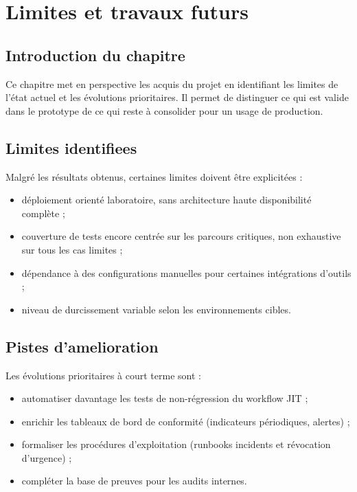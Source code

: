 \chapter{Limites et travaux futurs}

\section{Introduction du chapitre}
Ce chapitre met en perspective les acquis du projet en identifiant les limites de l'état actuel et les évolutions prioritaires. Il permet de distinguer ce qui est valide dans le prototype de ce qui reste à consolider pour un usage de production.

\section{Limites identifiees}
Malgré les résultats obtenus, certaines limites doivent être explicitées :
\begin{itemize}
	\item déploiement orienté laboratoire, sans architecture haute disponibilité complète ;
	\item couverture de tests encore centrée sur les parcours critiques, non exhaustive sur tous les cas limites ;
	\item dépendance à des configurations manuelles pour certaines intégrations d'outils ;
	\item niveau de durcissement variable selon les environnements cibles.
\end{itemize}

\section{Pistes d'amelioration}
Les évolutions prioritaires à court terme sont :
\begin{itemize}
	\item automatiser davantage les tests de non-régression du workflow JIT ;
	\item enrichir les tableaux de bord de conformité (indicateurs périodiques, alertes) ;
	\item formaliser les procédures d'exploitation (runbooks incidents et révocation d'urgence) ;
	\item compléter la base de preuves pour les audits internes.
\end{itemize}

